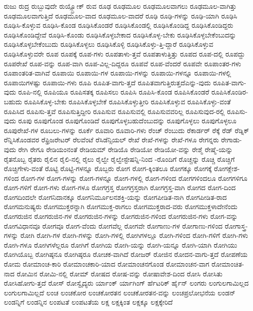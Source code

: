 {ರುಜು
ರುದ್ರ
ರುಬ್ಬುವುದೇ
ರುಯ್ಸ್ಬ್ರೋಕ್
ರುವ
ರೂಢ
ರೂಢಮೂಲ
ರೂಢಮೂಲವಾಗಲು
ರೂಢಮೂಲ-ವಾಗಿತ್ತು
ರೂಢಮೂಲವಾಗುತ್ತಿದೆ
ರೂಢಮೂಲ-ವಾದ
ರೂಢಮೂಲ-ವಾದರೆ
ರೂಢಿ
ರೂಢಿ-ಗಳನ್ನು
ರೂಢಿ-ಯಾಗಿ
ರೂಢಿಸಿ
ರೂಢಿಸಿ-ಕೊಳ್ಳುವ
ರೂಢಿಸಿ-ಕೊಂಡ
ರೂಢಿಸಿಕೊಂಡರೆ
ರೂಢಿಸಿಕೊಂಡಲ್ಲಿ
ರೂಢಿಸಿಕೊಂಡಿದ್ದ
ರೂಢಿಸಿಕೊಂಡಿದ್ದರು
ರೂಢಿಸಿಕೊಂಡಿದ್ದೇವೆ
ರೂಢಿಸಿ-ಕೊಂಡು
ರೂಢಿಸಿಕೊಳ್ಳಬೇಕಾದ
ರೂಢಿಸಿಕೊಳ್ಳ-ಬೇಕು
ರೂಢಿಸಿಕೊಳ್ಳಬೇಕೆಂಬುದನ್ನು
ರೂಢಿಸಿಕೊಳ್ಳಬೇಕೆಂಬುದು
ರೂಢಿಸಿಕೊಳ್ಳಲು
ರೂಢಿಸಿಕೊಳ್ಳಿ
ರೂಢಿಸಿಕೊಳ್ಳು-ತ್ತಿ-ದ್ದಾರೆ
ರೂಢಿಸಿಕೊಳ್ಳುವ
ರೂಢಿಸಿಕೊಳ್ಳುವರೇ
ರೂಪ
ರೂಪಕ್ಕೆ
ರೂಪ-ಗಳು
ರೂಪತಾಳು-ತ್ತವೆ
ರೂಪತಾಳುತ್ತಿತ್ತು
ರೂಪದ
ರೂಪ-ದಲ್ಲಿ
ರೂಪದ್ದು
ರೂಪರೇಖೆ
ರೂಪ-ವನ್ನು
ರೂಪ-ವಾಗಿ
ರೂಪ-ವಿಲ್ಲ-ದಿದ್ದರೂ
ರೂಪವೆ
ರೂಪ-ವೆಂದರೆ
ರೂಪವೇ
ರೂಪಾಂತರ-ಗಳು
ರೂಪಾಂತರಿತ-ವಾಗಿವೆ
ರೂಪಾಯಿ
ರೂಪಾಯಿ-ಗಳ
ರೂಪಾಯಿ-ಗಳನ್ನು
ರೂಪಾಯಿ-ಗಳನ್ನೂ
ರೂಪಾಯಿ-ಗಳಲ್ಲಿ
ರೂಪಾಯಿಗಳಷ್ಟು
ರೂಪಾಯಿ-ಗಳು
ರೂಪಿ
ರೂಪಿತ-ವಾಗು-ತ್ತದೆ
ರೂಪಿತವಾಗುತ್ತಿರುತ್ತದೆಎನ್ನು-ವುದು
ರೂಪಿತ-ವಾಗು-ವುದು
ರೂಪಿ-ನಲ್ಲಿ
ರೂಪಿಯೂ
ರೂಪಿಸತಕ್ಕ
ರೂಪಿಸಲು
ರೂಪಿಸಿ
ರೂಪಿಸಿ-ಕೊಂಡ
ರೂಪಿಸಿಕೊಂಡರೆ
ರೂಪಿಸಿಕೊಂಡಿರ-ಬಹುದು
ರೂಪಿಸಿಕೊಳ್ಳ-ಬೇಕು
ರೂಪಿಸಿಕೊಳ್ಳಬೇಕೆ
ರೂಪಿಸಿಕೊಳ್ಳುತ್ತೀರಿ
ರೂಪಿಸಿಕೊಳ್ಳುವ
ರೂಪಿಸಿಕೊಳ್ಳು-ವಂತೆ
ರೂಪಿಸಿದ
ರೂಪಿಸು-ತ್ತವೆ
ರೂಪಿಸುತ್ತಿದ್ದೀರಿ
ರೂಪಿಸುವ
ರೂಪಿಸುವಲ್ಲಿ
ರೂಪಿಸುವವರಿಲ್ಲ
ರೂಪಿಸುವುದ-ರಲ್ಲಿ
ರೂಪಿಸು-ವುದು
ರೂಪು
ರೂಪುಗೊಂಡ
ರೂಪುಗೊಂಡಿದೆ
ರೂಪುಗೊಳ್ಳಬಹುದೆಂಬುದನ್ನು
ರೂಪುಗೊಳ್ಳಲು
ರೂಪುಗೊಳ್ಳಲೂ
ರೂಪುರೇಖೆ-ಗಳ
ರೂಬಲು-ಗಳನ್ನು
ರೂರ್ಕೆ
ರೂವಾರಿ
ರೂವಾರಿ-ಗಳು
ರೆಂಚ್
ರೆಂಬುದು
ರೆಕಾರ್ಡರ್
ರೆಕ್ಕೆ
ರೆಡ್
ರೆಡ್ನಿಕ್
ರೆನ್ನಿಸಿಕೊಂಡವರ
ರೆಫ್ರಿಜರೇಟರ್
ರೆಲವೆಂಟೆ
ರೆಸಿಡೆನ್ಸಿಯಲ್
ರೇಖೆ
ರೇಖೆ-ಗಳನ್ನು
ರೇಖೆ-ಗಳೂ
ರೇಗನ್ನರು
ರೇಗಾಡು-ವುದು
ರೇಗಿ
ರೇಗೂ
ರೇಡಿಯಂನಂತೆ
ರೇಡಿಯಮ್
ರೇಡಿಯೊ
ರೇಡಿಯೋ
ರೇಡಿಯೋ-ವನ್ನು
ರೇಶ್ಮೆ
ರೇಷ್ಮೆ-ಯನ್ನು
ರೈತನೊಬ್ಬ
ರೈತರು
ರೈಲಿನ
ರೈಲಿ-ನಲ್ಲಿ
ರೈಲು
ರೈಲ್ವೇ
ರೈಲ್ವೇಸ್ಟೇಷನ್ನಿ-ನಿಂದ
-ರೊಂದಿಗೆ
ರೊಚ್ಚನ್ನು
ರೊಚ್ಚಿ
ರೊಚ್ಚಿಗೆ
ರೊಚ್ಚಿಗೇಳು-ವಂತೆ
ರೊಟ್ಟಿ
ರೊಟ್ಟಿ-ಗಳನ್ನೂ
ರೊಬ್ಬರು
ರೋಗ
ರೋಗ-ಕ್ಕಿಂತಲೂ
ರೋಗಕ್ಕೂ
ರೋಗಕ್ಕೆ
ರೋಗಕ್ಲೇಶ-ಗಳಿಂದ
ರೋಗ-ಗಳ
ರೋಗ-ಗಳನ್ನು
ರೋಗ-ಗಳನ್ನೂ
ರೋಗ-ಗಳಲ್ಲಿ
ರೋಗ-ಗಳಿಂದ
ರೋಗಗಳಿಂದಲೂ
ರೋಗಗಳಿಗೂ
ರೋಗ-ಗಳಿಗೆ
ರೋಗ-ಗಳು
ರೋಗ-ಗಳೂ
ರೋಗಗ್ರಸ್ತ
ರೋಗಗ್ರಸ್ತರಾಗಿ
ರೋಗಗ್ರಸ್ತ-ವಾಗಿ
ರೋಗದ
ರೋಗ-ದಿಂದ
ರೋಗದಿಂದಲೇ
ರೋಗನಿದಾನಕ್ಕೂ
ರೋಗನಿರ್ಮೂಲನಶಕ್ತಿ-ಯನ್ನು
ರೋಗಪೀಡಿತ-ನಾಗಿ
ರೋಗಪೀಡಿತ-ರಾದ
ರೋಗಮನುಷ್ಯರು
ರೋಗಮುಕ್ತರನ್ನಾಗಿ
ರೋಗಮುಕ್ತ-ರಾಗಲು
ರೋಗಮುಕ್ತರಾದ-ವರು
ರೋಗಮುಕ್ತಳಾದೇನೆಂದು
ರೋಗರುಜಿನ
ರೋಗರುಜಿನ-ಗಳ
ರೋಗರುಜಿನ-ಗಳನ್ನು
ರೋಗರುಜಿನ-ಗಳಿಂದ
ರೋಗರುಜಿನ-ಗಳು
ರೋಗ-ವನ್ನು
ರೋಗವಿಧಾನವೂ
ರೋಗವೂ
ರೋಗ-ವೆಂದು
ರೋಗವೆಲ್ಲ
ರೋಗವೇ
ರೋಗಾಣು-ಗಳ
ರೋಗಾಣು-ಗಳಿಂದ
ರೋಗಾಸ್ತ್ರ-ಗಳನ್ನು
ರೋಗಿ
ರೋಗಿ-ಗಳ
ರೋಗಿ-ಗಳನ್ನು
ರೋಗಿ-ಗಳಲ್ಲಿ
ರೋಗಿಗಳಲ್ಲೂ
ರೋಗಿ-ಗಳಿಂದ
ರೋಗಿ-ಗಳಿಗೆ
ರೋಗಿ-ಗಳು
ರೋಗಿ-ಗಳೂ
ರೋಗಿಗಳೆಲ್ಲರೂ
ರೋಗಿಗೆ
ರೋಗಿಯ
ರೋಗಿ-ಯನ್ನು
ರೋಗಿ-ಯನ್ನೂ
ರೋಗಿ-ಯಾಗಿ
ರೋಗಿಯು
ರೋಗಿಯೊಬ್ಬ
ರೋಗಿಷ್ಠನೂ
ರೋಗಿಷ್ಠರೂ
ರೋಚಕ-ವಾಗಿದೆ
ರೋಜರ್
ರೋಜಿನ
ರೋದನ-ವಾಗು-ತ್ತದೆ
ರೋಪಣೆಯ
ರೋಮ
ರೋಮಾಂಚ-ಕಾರಿ
ರೋಮಾಂಚಕಾರಿ-ಯಾದ
ರೋಮಾಂಚನಗೊಂಡ
ರೋಮಾಂಚನ-ವಾಗ
ರೋಮಾಂಚಿತ-ನಾದ
ರೋಮಿನ
ರೋಮಿ-ನಲ್ಲಿ
ರೋಮ್
ರೋಷದ
ರೋಷ-ವನ್ನು
ರೋಷಾವೇಶ-ದಿಂದ
ರೋಸಿ
ರೋಸಿತು
ರೋಸಿಹೋಗು-ತ್ತದೆ
ರೋಸ್
ರೋಸ್ವೈದ್ಯರು
ರ್ಯಾಂಕ್
ರ್ಯಾಗಿಂಗ್
ರ್ಹೆಟರಿಕ್
ರ್ಹೈನ್
ಲಂಗರು
ಲಂಗುಲಗಾಮಿಲ್ಲದ
ಲಂಗುಲಗಾಮಿಲ್ಲದೆ
ಲಂಚ
ಲಂಚಕೋರ
ಲಂಚಕೋರತನ
ಲಂಚಕೋರತನ-ವನ್ನು
ಲಂಚಪ್ರಲೋಭನೆಯ
ಲಂಡನ್
ಲಂಡನ್ನಿಗೆ
ಲಂಡನ್ನಿನ
ಲಂಪಟತೆ
ಲಂಪಟತೆಯ
ಲಕ್ಷ
ಲಕ್ಷಕ್ಕಿಂತ
ಲಕ್ಷಕ್ಕೂ
ಲಕ್ಷಕ್ಕೇರಿದೆ
}
